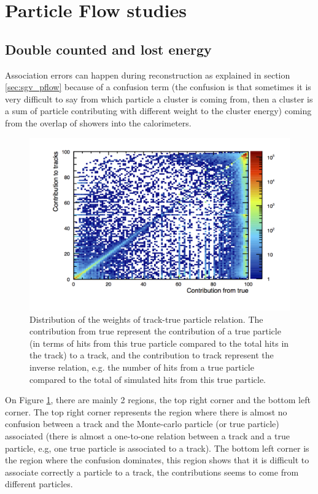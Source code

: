 \section{Particle Flow studies}

\subsection{Double counted and lost energy}

Association errors can happen during reconstruction as explained in section \ref{sec:sgv_pflow} because of a confusion term (the confusion is that sometimes it is very difficult to say from which particle a cluster is coming from, then a cluster is a sum of particle contributing with different weight to the cluster energy) coming from the overlap of showers into the calorimeters.

\begin{figure}[t]
  \centering
  \includegraphics[scale=0.5]{chap6/fig_SGV/weight_corr.png}
  \caption{Distribution of the weights of track-true particle relation. The contribution from true represent the contribution of a true particle (in terms of hits from this true particle compared to the total hits in the track) to a track, and the contribution to track represent the inverse relation, e.g. the number of hits from a true particle compared to the total of simulated hits from this true particle.}
  \label{fig:weight}
\end{figure}

On Figure \ref{fig:weight}, there are mainly 2 regions, the top right corner and the bottom left corner. The top right corner represents the region where there is almost no confusion between a track and the Monte-carlo particle (or true particle) associated (there is almost a one-to-one relation between a track and a true particle, e.g, one true particle is associated to a track). The bottom left corner is the region where the confusion dominates, this region shows that it is difficult to associate correctly a particle to a track, the contributions seems to come from different particles.

